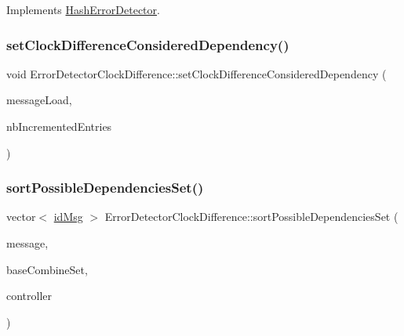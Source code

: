 Implements \hyperlink{class_hash_error_detector_ac0a25b9c1e27f98223869d11ca46d18f}{Hash\+Error\+Detector}.

\mbox{\label{class_error_detector_clock_difference_a529b87b6eaee9041601af1ca36b51c93}} 
\subsubsection{\texorpdfstring{set\+Clock\+Difference\+Considered\+Dependency()}{setClockDifferenceConsideredDependency()}}
{\footnotesize\ttfamily void Error\+Detector\+Clock\+Difference\+::set\+Clock\+Difference\+Considered\+Dependency (\begin{DoxyParamCaption}\item[{unsigned int}]{message\+Load,  }\item[{unsigned}]{nb\+Incremented\+Entries }\end{DoxyParamCaption})}

\mbox{\label{class_error_detector_clock_difference_a740f6bd74b30e0b194c4b64d79bb8caf}} 
\subsubsection{\texorpdfstring{sort\+Possible\+Dependencies\+Set()}{sortPossibleDependenciesSet()}}
{\footnotesize\ttfamily vector$<$ \hyperlink{structures_8h_a83a1d9a070efa5341da84cfd8e28d3e5}{id\+Msg} $>$ Error\+Detector\+Clock\+Difference\+::sort\+Possible\+Dependencies\+Set (\begin{DoxyParamCaption}\item[{const \hyperlink{structures_8h_a7e7bdc1d2fff8a9436f2f352b2711ed6}{message\+Info} \&}]{message,  }\item[{const vector$<$ \hyperlink{structures_8h_a7e7bdc1d2fff8a9436f2f352b2711ed6}{message\+Info} $>$ \&}]{base\+Combine\+Set,  }\item[{\hyperlink{class_controller}{Controller} $\ast$}]{controller }\end{DoxyParamCaption})\hspace{0.3cm}{\ttfamily [virtual]}}



